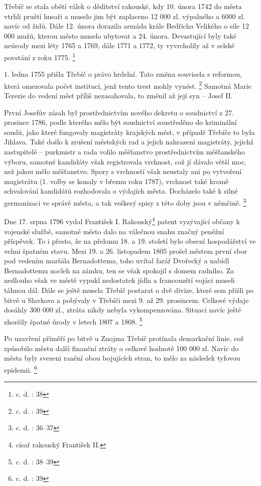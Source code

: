 \documentclass[a4paper,oneside,12p]{report}
\begin{document}
Třebíč se stala obětí válek o děditství rakouské, kdy 10. února 1742 do města vtrhli pruští husaři a muselo jim být zaplaceno 12 000 zl. výpalného a 6000 zl. navíc od židů.
Dále 12. února dorazila armáda krále Bedřicha Velikého o síle 12 000 mužů, kterou město muselo ubytovat a 24. února.
Devastující byly také neúrody mezi léty 1765 a 1769, dále 1771 a 1772, ty vyvrcholily až v selské povstání z roku 1775. \footnote{c. d. : 38}

1. ledna 1755 přišla Třebíč o právo hrdelní.
Tato změna souvisela s reformou, která omezovala počet institucí, jenž tento trest mohly vynést. \footnote{c. d. : 39}
Samotná Marie Terezie do vedení měst příliš nezasahovala, to změnil až její syn -- Josef II.

První Josefův zásah byl prostřednictvím nového dekretu o soudnictví z 27. prosince 1786, podle kterého mělo být soudnictví soustředěno do kriminální soudů, jako které fungovaly magistráty krajských měst, v případě Třebíče to byla Jihlava.
Také došlo k zrušení městských rad a jejich nahrazení magistráty, jejichž zastupitelé -- purkmistr a rada volilo měšťanstvo prostřednictvím měšťanského výboru, samotné kandidáty však registrovala vrchnost, což jí dávalo větší moc, než jakou mělo měšťanstvo.
Spory s vrchností však neustaly ani po vytvoření magistrátu (1. volby se konaly v březnu roku 1787), vrchnost také kromě schvalování kandidátů rozhodovala o výdajích města.
Docházelo také k silné germanizaci ve správě města, a tak veškerý spisy z této doby jsou v němčině. \footnote{c. d. : 36--37}

Dne 17. srpna 1796 vydal František I. Rakouský\footnote{císař rakouský František II.} patent vyzývající občany k vojenské službě, samotné město dalo na válečnou snahu značný peněžní příspěvek.
To i přesto, že na přelomu 18. a 19. století bylo obecní hospodářství ve velmi špatném stavu.
Mezi 19. a 26. listopadem 1805 prošel městem první sbor pod vedením maršála Bernadottema, toho uvítal farář Dvořecký a nabídl Bernadottemu nocleh na zámku, ten se však spokojil s domem radního.
Za nedlouho však ve městě vypukl nedostatek jídla a francouzští vojáci museli táhnou dál.
Dále se ještě musela Třebíč postarat o dvě divize, které sem přišli po bitvě u Slavkova a pobývaly v Třebíči mezi 9. až 29. prosincem.
Celkové výdaje dosáhly 300 000 zl., ztráta nikdy nebyla vykompenzována.
Situaci navíc ještě zhoršily špatné úrody v letech 1807 a 1808. \footnote{c. d. : 38--39}

Po uzavření příměří po bitvě u Znojma Třebíč protínala demarkační linie, což způsobilo městu další finanční ztráty o celkové hodnotě 100 000 zl.
Navíc do města byly svezeni ranění obou bojujících stran, to mělo za následek tyfovou epidemii. \footnote{c. d. : 39}
\end{document}
